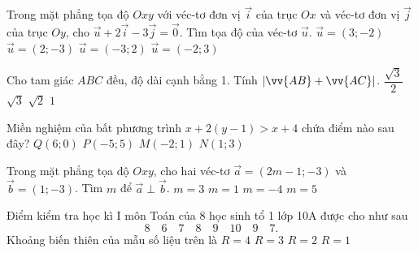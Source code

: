 \begin{ex}%
	Trong mặt phẳng tọa độ $Oxy$ với véc-tơ đơn vị $\vec{i}$ của trục $Ox$ và véc-tơ đơn vị $\vec{j}$ của trục $Oy$, cho $\vec{u}+2\vec{i}-3\vec{j}=\vec{0}$. Tìm tọa độ của véc-tơ $\vec{u}$.
	\choice
	{$\vec{u}=(3;-2)$}
	{$\vec{u}=(2;-3)$}
	{$\vec{u}=(-3;2)$}
	{\True $\vec{u}=(-2;3)$}
\end{ex}
\begin{ex}%
	Cho tam giác $ABC$ đều, độ dài cạnh bằng 1. Tính $|\vv{AB}+\vv{AC}|$.
	\choice
	{$\dfrac{\sqrt{3}}{2}$}
	{\True $\sqrt{3}$}
	{$\sqrt{2}$}
	{$1$}
\end{ex}
\begin{ex}%
	Miền nghiệm của bất phương trình $x+2(y-1)>x+4$ chứa điểm nào sau đây?
	\choice
	{$Q(6;0)$}
	{\True $P(-5;5)$}
	{$M(-2;1)$}
	{$N(1;3)$}
\end{ex}
\begin{ex}%
	Trong mặt phẳng tọa độ $Oxy$, cho hai véc-tơ $\vec{a}=(2m-1;-3)$ và $\vec{b}=(1;-3)$. Tìm $m$ để $\vec{a}\perp\vec{b}$.
	\choice
	{$m=3$}
	{$m=1$}
	{\True $m=-4$}
	{$m=5$}
\end{ex}
\begin{ex}%
	Điểm kiểm tra học kì I môn Toán của 8 học sinh tổ 1 lớp 10A được cho như sau
	\begin{equation*}
		8\quad6\quad7\quad8\quad9\quad10\quad9\quad7.
	\end{equation*}Khoảng biến thiên của mẫu số liệu trên là
	\choice
	{\True $R=4$}
	{$R=3$}
	{$R=2$}
	{$R=1$}
\end{ex}
